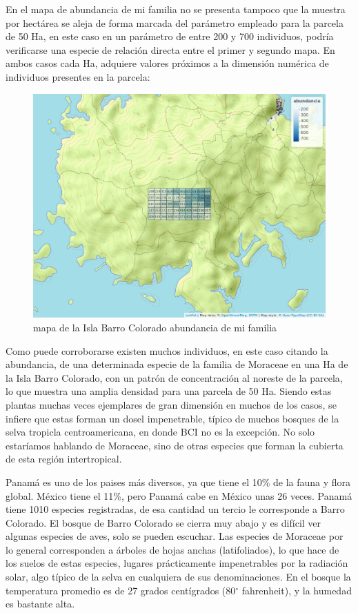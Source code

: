 \documentclass[11pt,]{article}
\begin{document}
En el mapa de abundancia de mi familia no se presenta tampoco que la
muestra por hectárea se aleja de forma marcada del parámetro empleado
para la parcela de 50 Ha, en este caso en un parámetro de entre 200 y
700 individuos, podría verificarse una especie de relación directa entre
el primer y segundo mapa. En ambos casos cada Ha, adquiere valores
próximos a la dimensión numérica de individuos presentes en la parcela:

\begin{figure}
\centering
\includegraphics[width=1.00000\textwidth]{mapa_cuadros_abun_mi_familia.png}
\caption{mapa de la Isla Barro Colorado abundancia de mi familia
\label{fig:bci_map}}
\end{figure}

Como puede corroborarse existen muchos individuos, en este caso citando
la abundancia, de una determinada especie de la familia de Moraceae en
una Ha de la Isla Barro Colorado, con un patrón de concentración al
noreste de la parcela, lo que muestra una amplia densidad para una
parcela de 50 Ha. Siendo estas plantas muchas veces ejemplares de gran
dimensión en muchos de los casos, se infiere que estas forman un dosel
impenetrable, típico de muchos bosques de la selva tropicla
centroamericana, en donde BCI no es la excepción. No solo estaríamos
hablando de Moraceae, sino de otras especies que forman la cubierta de
esta región intertropical.

Panamá es uno de los paises más diversos, ya que tiene el 10\% de la
fauna y flora global. México tiene el 11\%, pero Panamá cabe en México
unas 26 veces. Panamá tiene 1010 especies registradas, de esa cantidad
un tercio le corresponde a Barro Colorado. El bosque de Barro Colorado
se cierra muy abajo y es difícil ver algunas especies de aves, solo se
pueden escuchar. Las especies de Moraceae por lo general corresponden a
árboles de hojas anchas (latifoliados), lo que hace de los suelos de
estas especies, lugares prácticamente impenetrables por la radiación
solar, algo típico de la selva en cualquiera de sus denominaciones. En
el bosque la temperatura promedio es de 27 grados centígrados
(80\(^\circ\) fahrenheit), y la humedad es bastante alta.
\end{document}
